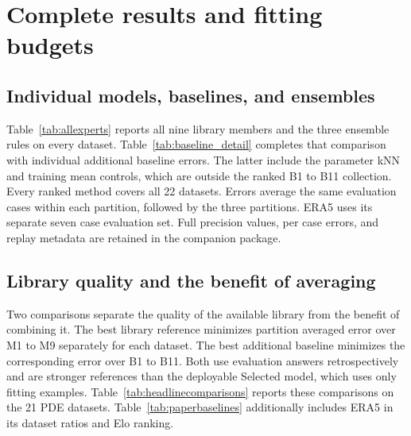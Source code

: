 \section{Complete results and fitting budgets}
\label{app:allresults}
\subsection{Individual models, baselines, and ensembles}
\label{app:matchedbaselines}
Table~\ref{tab:allexperts} reports all nine library members and the three
ensemble rules on every dataset. Table~\ref{tab:baseline_detail}
completes that comparison with individual
additional baseline errors. The latter include the parameter kNN and training
mean controls, which are outside the ranked B1 to B11 collection. Every ranked
method covers all 22 datasets. Errors average the same evaluation cases
within each partition, followed by the three partitions. ERA5 uses its separate
seven case evaluation set. Full precision values, per case errors, and replay
metadata are retained in the companion package.

\begin{table}[h!]
\centering\footnotesize
\caption{\textbf{Additional baseline errors across all 22 datasets.} Mean relative $L^2$
errors in percent. B1: Autoregressive POD GP. B2: Nonlinear POD GP.
B3: Composite MF MLP. B4: Composite MF DeepONet. B5: Latent MF network.
B6: Nonlinear decoder transfer. B7: MFRNP adapter. B8: Fidelity basis FNO.
B9 and B10: FNO transfer I and II. B11: Affine POD GP. B12: Parameter kNN.
B13: Training mean. Mixtures use five fitting examples and the same evaluation
cases. A dash marks an unavailable additional
control, not a missing ranked method. B9 and B10's implementation relationship
is described in Appendix~\ref{app:adaptations}. Imported data are from
MFRNP \citep{niu2024} and ERA5 reanalysis \citep{hersbach2020}.
Daggers identify the data quality exclusions in Appendix~\ref{app:subsets}.}
\label{tab:baseline_detail}
{\scriptsize\setlength{\tabcolsep}{2pt}
\renewcommand{\arraystretch}{1.15}
\resizebox{\linewidth}{!}{}}
\end{table}

\subsection{Library quality and the benefit of averaging}
\label{app:headlines}
Two comparisons separate the quality of the available library from the
benefit of combining it. The best library reference minimizes partition
averaged error over M1 to M9 separately for each dataset. The best additional
baseline minimizes the corresponding error over B1 to B11. Both use evaluation
answers retrospectively and are stronger references than the deployable
Selected model, which uses only fitting examples.
Table~\ref{tab:headlinecomparisons} reports these comparisons on the 21 PDE
datasets. Table~\ref{tab:paperbaselines} additionally includes ERA5 in its
dataset ratios and Elo ranking.

